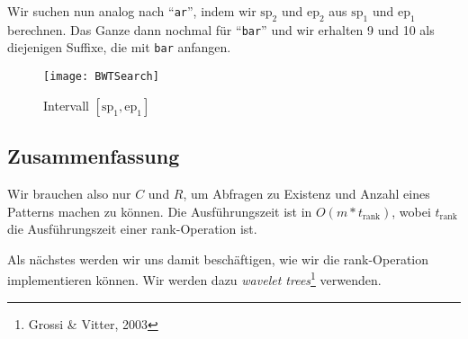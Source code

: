 \begin{minipage}{.7\textwidth}
  Wir suchen nun analog nach ``\texttt{ar}'', indem wir \( \text{sp}_2 \) und \( \text{ep}_2 \) aus \( \text{sp}_1 \) und \( \text{ep}_1 \) berechnen. Das Ganze dann nochmal für ``\texttt{bar}'' und wir erhalten 9 und 10 als diejenigen Suffixe, die mit \texttt{bar} anfangen.
\end{minipage}
\hfill
\begin{minipage}{.25\textwidth}
  \begin{figure}[H]
    \texttt{[image: BWTSearch]}
    \caption{Intervall \( [\text{sp}_1, \text{ep}_1] \)}
  \end{figure}
\end{minipage}

\subsection{Zusammenfassung}

Wir brauchen also nur \( C \) und \( R \), um Abfragen zu Existenz und Anzahl eines Patterns machen zu können. Die Ausführungszeit ist in \( O(m*t_{\text{rank}}) \), wobei \( t_{\text{rank}} \) die Ausführungszeit einer rank-Operation ist.

Als nächstes werden wir uns damit beschäftigen, wie wir die rank-Operation implementieren können. Wir werden dazu \emph{wavelet trees}\footnote{Grossi \& Vitter, 2003} verwenden.